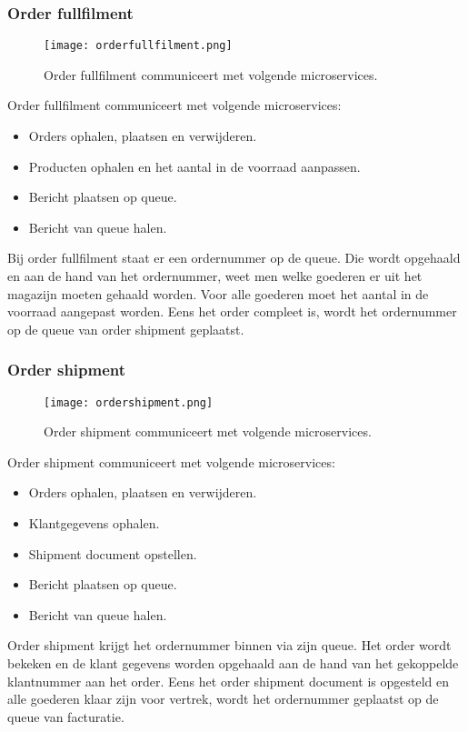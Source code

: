 \subsubsection{Order fullfilment}
\begin{figure}[h]
	\texttt{[image: orderfullfilment.png]}
	\caption{Order fullfilment communiceert met volgende microservices.}
	\centering
\end{figure}
Order fullfilment communiceert met volgende microservices:
\begin{itemize}
	\item Orders ophalen, plaatsen en verwijderen.
	\item Producten ophalen en het aantal in de voorraad aanpassen.
	\item Bericht plaatsen op queue.
	\item Bericht van queue halen.
\end{itemize}
Bij order fullfilment staat er een ordernummer op de queue. Die wordt opgehaald en aan de hand van het ordernummer, weet men welke goederen er uit het magazijn moeten gehaald worden. Voor alle goederen moet het aantal in de voorraad aangepast worden. Eens het order compleet is, wordt het ordernummer op de queue van order shipment geplaatst.

\subsubsection{Order shipment}
\begin{figure}[h]
	\texttt{[image: ordershipment.png]}
	\caption{Order shipment communiceert met volgende microservices.}
	\centering
\end{figure}
Order shipment communiceert met volgende microservices:
\begin{itemize}
	\item Orders ophalen, plaatsen en verwijderen.
	\item Klantgegevens ophalen.
	\item Shipment document opstellen.
	\item Bericht plaatsen op queue.
	\item Bericht van queue halen.
\end{itemize}
Order shipment krijgt het ordernummer binnen via zijn queue. Het order wordt bekeken en de klant gegevens worden opgehaald aan de hand van het gekoppelde klantnummer aan het order. Eens het order shipment document is opgesteld en alle goederen klaar zijn voor vertrek, wordt het ordernummer geplaatst op de queue van facturatie.

